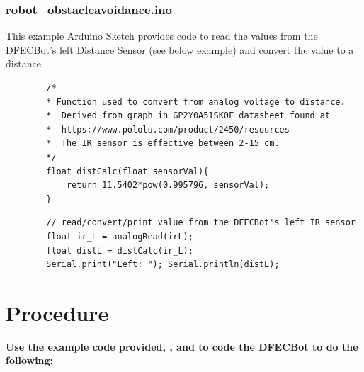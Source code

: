 \documentclass{handout}
\begin{document}
	\subsubsection{robot\_obstacleavoidance.ino}
	This example Arduino Sketch provides code to read the values from the DFECBot's left Distance Sensor (see below example) and convert the value to a distance.
	
	\begin{lstlisting}
		/*
		* Function used to convert from analog voltage to distance. 
		*  Derived from graph in GP2Y0A51SK0F datasheet found at 
		*  https://www.pololu.com/product/2450/resources
		*  The IR sensor is effective between 2-15 cm.
		*/
		float distCalc(float sensorVal){
			return 11.5402*pow(0.995796, sensorVal);
		}
	\end{lstlisting}
	
	\begin{lstlisting}
		// read/convert/print value from the DFECBot's left IR sensor
		float ir_L = analogRead(irL);
		float distL = distCalc(ir_L);
		Serial.print("Left: "); Serial.println(distL);
	\end{lstlisting}
	
	\newpage
	\clearpage
	\pagebreak
	
	\section{Procedure}
	\textbf{Use the example code provided, , and  to code the DFECBot to do the following:}
		
\end{document}
